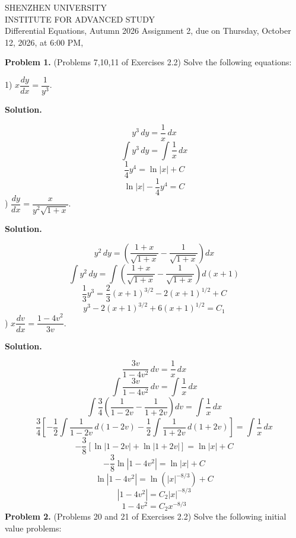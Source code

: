 \documentclass[11pt,a4paper]{article}
\begin{document}
\begin{center}
SHENZHEN UNIVERSITY \\
INSTITUTE FOR ADVANCED STUDY \\
Differential Equations, Autumn 2026
Assignment 2, due on Thursday, October 12, 2026, at 6:00 PM,

\end{center}


\bigskip
\noindent
{\bf Problem 1.}  (Problems 7,10,11 of Exercises 2.2) Solve the following equations:

1) $x\dfrac{dy}{dx}=\dfrac{1}{y^3}$.
\medskip
\par\noindent
\textbf{Solution.}\par
\[
y^3\,dy=\frac{1}{x}\,dx
\]
\[
\int y^3\,dy=\int\frac{1}{x}\,dx
\]
\[
\frac{1}{4}y^4=\ln|x|+C
\]
\[
\ln|x|-\frac{1}{4}y^4=C
\]
) $\dfrac{dy}{dx}=\dfrac{x}{y^2\sqrt{1+x}}$.
\medskip
\par\noindent
\textbf{Solution.}\par
\[
y^2\,dy=
\left(\frac{1+x}{\sqrt{1+x}}-\frac{1}{\sqrt{1+x}}\right)dx
\]
\[
\int y^2\,dy=
\int\left(\frac{1+x}{\sqrt{1+x}}-\frac{1}{\sqrt{1+x}}\right)d(x+1)
\]
\[
\frac{1}{3}y^3=
\frac{2}{3}(x+1)^{3/2}-2(x+1)^{1/2}+C
\]
\[
y^3-2(x+1)^{3/2}+6(x+1)^{1/2}=C_1
\]
) $x\dfrac{dv}{dx}=\dfrac{1-4v^2}{3v}$.
\medskip
\par\noindent
\textbf{Solution.}\par
\[
\frac{3v}{1-4v^2}\,dv=\frac{1}{x}\,dx
\]
\[
\int\frac{3v}{1-4v^2}\,dv=\int\frac{1}{x}\,dx
\]
\[
\int\frac{3}{4}
\left(\frac{1}{1-2v}-\frac{1}{1+2v}\right)dv
=\int\frac{1}{x}\,dx
\]
\[
\frac{3}{4}\left[
-\frac{1}{2}\int\frac{1}{1-2v}\,d(1-2v)
-\frac{1}{2}\int\frac{1}{1+2v}\,d(1+2v)
\right]
=\int\frac{1}{x}\,dx
\]
\[
-\frac{3}{8}\left[\ln|1-2v|+\ln|1+2v|\right]
=\ln|x|+C
\]
\[
-\frac{3}{8}\ln|1-4v^2|=\ln|x|+C
\]
\[
\ln|1-4v^2|=\ln\left(|x|^{-8/3}\right)+C
\]
\[
|1-4v^2|=C_2|x|^{-8/3}
\]
\[
1-4v^2=C_2x^{-8/3}
\]
\medskip
\bigskip
\noindent
{\bf Problem 2.}  (Problems 20 and 21 of Exercises 2.2)
Solve the following initial value problems:
\end{document}
